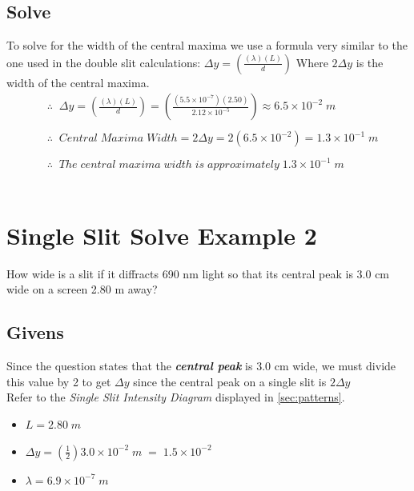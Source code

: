 \documentclass{article}
\begin{document}
\subsection*{Solve}
To solve for the width of the central maxima we use a formula very similar to the one used in the double slit calculations: $\Delta y = \left(\frac{(\lambda)(L)}{d}\right)$ Where $2\Delta y$ is the width of the central maxima.\\
\begin{align*}
     & \therefore\;\;\Delta y = \left(\frac{(\lambda)(L)}{d}\right) = \left(\frac{(5.5 \times 10^{-7})(2.50)}{2.12 \times 10^{-5}}\right) \approx 6.5 \times 10^{-2}\;m \\\\
     & \therefore\;\;Central\;Maxima\;Width = 2\Delta y = 2(6.5 \times 10^{-2}) = 1.3 \times 10^{-1}\;m                                                                 \\\\
     & \therefore\;\;The\;central\;maxima\;width\;is\;approximately\;1.3 \times 10^{-1}\;m
\end{align*}\leavevmode\\

\section*{Single Slit Solve Example 2}
How wide is a slit if it diffracts 690 nm light so that its central peak is 3.0 cm wide on a screen 2.80 m away?
\subsection*{Givens}
Since the question states that the \textit{\textbf{central peak}} is 3.0 cm wide, we must divide this value by 2 to get $\Delta y$ since the central peak on a single slit is $2\Delta y$ \\Refer to the \textit{Single Slit Intensity Diagram} displayed in \cref{sec:patterns}.
\begin{itemize}
    \item $L = 2.80\;m$
    \item $ \Delta y = (\frac{1}{2})3.0 \times 10^{-2}\;m \;=\;1.5 \times 10^{-2}$
    \item $\lambda = 6.9 \times 10^{-7}\;m$
\end{itemize}\leavevmode
\end{document}
